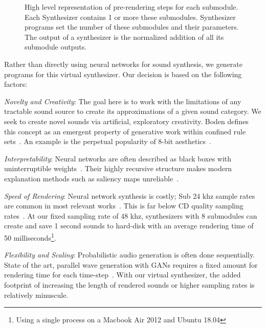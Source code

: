 \documentclass[runningheads,a4paper]{llncs}
\begin{document}
 \begin{figure}[tbp]
    \begin{center}
    \end{center}
    \caption{High level representation of pre-rendering steps for each submodule. Each Synthesizer contains 1 or more these submodules. Synthesizer programs set the number of these submodules and their parameters. The output of a synthesizer is the normalized addition of all its submodule outputs. 
    }
\label{fig:submodule}
\end{figure}
 Rather than directly using neural networks for sound synthesis, we generate programs for this virtual synthesizer. Our decision is based on the following factors:
\begin{enumerate*}[label=(\roman*)]
    \item \textit{Novelty and Creativity}: The goal here is to work with the limitations of any tractable sound source to create its approximations of a given sound category. We seek to create novel sounds via artificial, exploratory creativity. Boden defines this concept as an emergent property of generative work within confined rule sets~\cite{boden2009computer}. An example is the perpetual popularity of 8-bit aesthetics~\cite{collins2007loop}. 
    \item \textit{Interpretability}: Neural networks are often described as black boxes with uninterruptible weights~\cite{basheer2000artificial}. Their highly recursive structure makes modern explanation methods such as saliency maps unreliable~\cite{rudin2019stop}.  
    \item \textit{Speed of Rendering}: Neural network synthesis is costly; Sub 24 khz sample rates are common in most relevant works~\cite{yamamoto2020parallel,oord2017parallel,aouameur2019neural,ramires2020neural}. This is far below CD quality sampling rates~\cite{reiss2016meta}. At our fixed sampling rate of 48 khz, synthesizers with 8 submodules can create and save 1 second sounds to hard-disk with an average rendering time of 50 milliseconds\footnote{Using a single process on a Macbook Air 2012 and Ubuntu 18.04}. 
    \item \textit{Flexibility and Scaling}: Probabilistic audio generation is often done sequentially. State of the art, parallel wave generation with GANs requires a fixed amount for rendering time for each time-step~\cite{yamamoto2020parallel}. With our virtual synthesizer, the added footprint of increasing the length of rendered sounds or higher sampling rates is relatively minuscule.  
\end{enumerate*}
\end{document}
